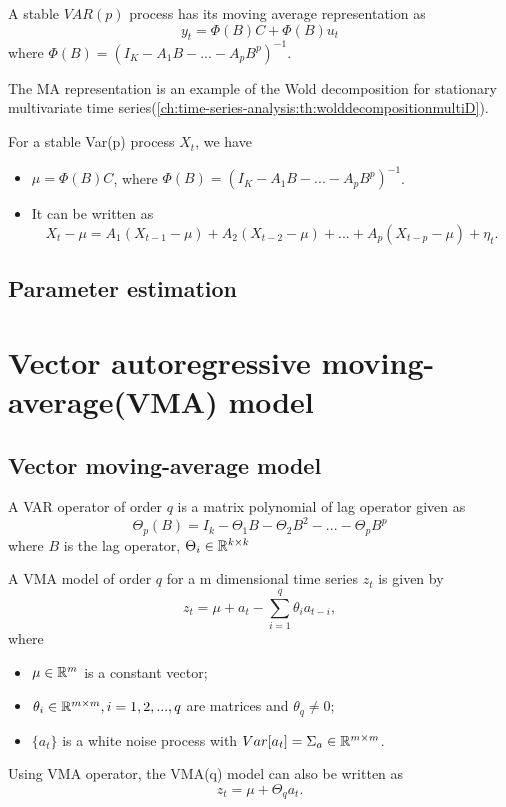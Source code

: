 \begin{corollary}[ MA representation]
A stable $VAR(p)$ process has its moving average representation as
$$y_t = \Phi(B)C + \Phi(B)u_t$$
where $\Phi(B) = (I_K - A_1B - ... - A_pB^p)^{-1}$.
\end{corollary}


\begin{remark}
The MA representation is an example of the Wold decomposition for stationary multivariate time series(\autoref{ch:time-series-analysis:th:wolddecompositionmultiD}).
\end{remark}


\begin{lemma}
For a stable Var(p) process $X_t$, we have
\begin{itemize}
\item $\mu = \Phi(B)C$, where $\Phi(B) = (I_K - A_1B - ... - A_pB^p)^{-1}$.
\item It can be written as
$$X_t - \mu = A_1(X_{t-1} - \mu) + A_2(X_{t-2} - \mu) + ... + A_p(X_{t-p} - \mu) + \eta_t.$$
\end{itemize} 
\end{lemma}

\subsection{Parameter estimation}


\section{Vector autoregressive moving-average(VMA) model}
\subsection{Vector moving-average model }
\begin{definition}
A VAR operator of order $q$ is a matrix polynomial of lag operator given as
$$\Theta_p(B) = I_k - \Theta_1B - \Theta_2 B^2 - ... - \Theta_p B^p$$
where $B$ is the lag operator, $\Theta_i \in \mathbb{R}^{k\times k}$
\end{definition}


\begin{definition}\cite[106]{tsay2013multivariate}
A VMA model of order $q$ for a m dimensional time series $z_t$ is given by
$$z_t = \mu + a_t - \sum_{i=1}^q \theta_i a_{t-i},$$
where
\begin{itemize}
	\item $\mu\in \mathbb{R}^m$ is a constant vector;
	\item $\theta_i \in \mathbb{R}^{m\times m}, i=1,2,...,q$ are matrices and $\theta_q \neq 0$;
	\item $\{a_t\}$ is a white noise process with $Var[a_t] = \Sigma_a \in \mathbb{R}^{m\times m}$. 
\end{itemize}

Using VMA operator, the VMA(q) model can also be written as
$$z_t = \mu + \Theta_q a_t.$$	
\end{definition}


